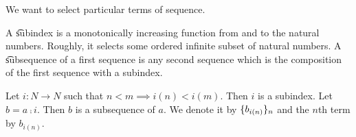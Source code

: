 

We want to select particular terms of sequence.


A \t{subindex} is a monotonically
increasing function from and to the
natural numbers.
Roughly,
it
selects some ordered infinite
subset of natural numbers.
A \t{subsequence} of a first
sequence is any second sequence
which is the composition of the
first sequence with a subindex.


Let $i: N \to N$ such that
$n < m \implies i(n) < i(m)$.
Then $i$ is a subindex.
Let $b = a \comp i$.
Then $b$ is a subsequence of $a$.
We denote it by
$\{b_{i(n)}\}_n$ and the $n$th
term by $b_{i(n)}$.

\blankpage
